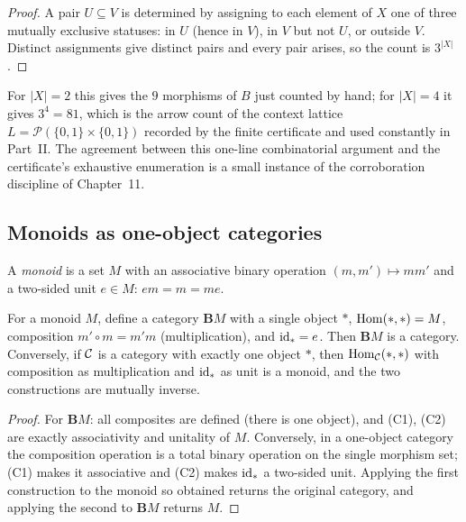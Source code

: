 \begin{proof}
A pair $U \subseteq V$ is determined by assigning to each element of $X$
one of three mutually exclusive statuses: in $U$ (hence in $V$), in
$V$ but not $U$, or outside $V$. Distinct assignments give distinct pairs
and every pair arises, so the count is $3^{|X|}$.
\end{proof}

For $|X| = 2$ this gives the $9$ morphisms of $B$ just counted by hand;
for $|X| = 4$ it gives $3^4 = 81$, which is the arrow count of the context
lattice $L = \mathcal{P}(\{0,1\} \times \{0,1\})$ recorded by the finite
certificate and used constantly in Part~II. The agreement between this
one-line combinatorial argument and the certificate's exhaustive
enumeration is a small instance of the corroboration discipline of
Chapter~11.

\subsection{Monoids as one-object categories}\label{ch02:sec:monoids}

\begin{definition}[Monoid]\label{ch02:def:monoid}
A \emph{monoid} is a set $M$ with an associative binary operation
$(m, m') \mapsto m m'$ and a two-sided unit $e \in M$: $e m = m = m e$.
\end{definition}

\begin{proposition}\label{ch02:prop:monoid-category}
For a monoid $M$, define a category $\mathbf{B}M$ with a single object
$\ast$, $\mathrm{Hom}(\ast, \ast) = M$, composition $m' \circ m = m' m$
(multiplication), and $\mathrm{id}_\ast = e$. Then $\mathbf{B}M$ is a category.
Conversely, if $\mathcal{C}$ is a category with exactly one object $\ast$, then
$\mathrm{Hom}_{\mathcal{C}}(\ast, \ast)$ with composition as multiplication and
$\mathrm{id}_\ast$ as unit is a monoid, and the two constructions are mutually
inverse.
\end{proposition}

\begin{proof}
For $\mathbf{B}M$: all composites are defined (there is one object), and
(C1), (C2) are exactly associativity and unitality of $M$. Conversely, in
a one-object category the composition operation is a total binary
operation on the single morphism set; (C1) makes it associative and (C2)
makes $\mathrm{id}_\ast$ a two-sided unit. Applying the first construction to the
monoid so obtained returns the original category, and applying the second
to $\mathbf{B}M$ returns $M$.
\end{proof}


